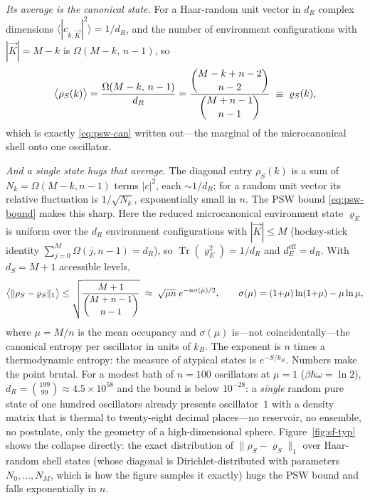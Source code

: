 \documentclass[11pt,a4paper]{article}
\theoremstyle{definition}
\begin{document}
\emph{Its average is the canonical state.} For a Haar-random unit vector in
$d_R$ complex dimensions $\langle|c_{k,\vec K}|^{2}\rangle=1/d_R$, and the number
of environment configurations with $|\vec K|=M-k$ is $\Omega(M-k,\,n-1)$, so
\begin{equation}\label{eq:sho-avg}
\big\langle\rho_S(k)\big\rangle
 =\frac{\Omega(M-k,\,n-1)}{d_R}
 =\frac{\dbinom{M-k+n-2}{\,n-2\,}}{\dbinom{M+n-1}{\,n-1\,}}
 \;\equiv\;\varrho_S(k),
\end{equation}
which is exactly \eqref{eq:psw-can} written out---the marginal of the
microcanonical shell onto one oscillator.

\emph{And a single state hugs that average.} The diagonal entry $\rho_S(k)$ is a
sum of $N_k=\Omega(M-k,n-1)$ terms $|c|^{2}$, each $\sim1/d_R$; for a random unit
vector its relative fluctuation is $1/\sqrt{N_k}$, exponentially small in $n$.
The PSW bound \eqref{eq:psw-bound} makes this sharp. Here the reduced
microcanonical environment state $\varrho_E$ is uniform over the $d_R$
environment configurations with $|\vec K|\le M$ (hockey-stick identity
$\sum_{j=0}^{M}\Omega(j,n-1)=d_R$), so $\operatorname{Tr}(\varrho_E^{2})=1/d_R$
and $d_E^{\mathrm{eff}}=d_R$. With $d_S=M+1$ accessible levels,
\begin{equation}\label{eq:sho-bound}
\big\langle\lVert\rho_S-\varrho_S\rVert_1\big\rangle
 \le\sqrt{\frac{M+1}{\dbinom{M+n-1}{\,n-1\,}}}
 \;\approx\;\sqrt{\mu n}\;e^{-n\sigma(\mu)/2},
\qquad
\sigma(\mu)=(1{+}\mu)\ln(1{+}\mu)-\mu\ln\mu,
\end{equation}
where $\mu=M/n$ is the mean occupancy and $\sigma(\mu)$ is---not
coincidentally---the canonical entropy per oscillator in units of $k_B$. The
exponent is $n$ times a thermodynamic entropy: the measure of atypical states is
$e^{-S/k_B}$. Numbers make the point brutal. For a modest bath of $n=100$
oscillators at $\mu=1$ ($\beta\hbar\omega=\ln2$),
$d_R=\binom{199}{99}\approx4.5\times10^{58}$ and the bound is below $10^{-28}$: a
\emph{single} random pure state of one hundred oscillators already presents
oscillator~$1$ with a density matrix that is thermal to twenty-eight decimal
places---no reservoir, no ensemble, no postulate, only the geometry of a
high-dimensional sphere.
Figure~\ref{fig:sf-typ} shows the collapse directly: the exact distribution of
$\lVert\rho_S-\varrho_S\rVert_1$ over Haar-random shell states (whose diagonal
is Dirichlet-distributed with parameters $N_0,\dots,N_M$, which is how the
figure samples it exactly) hugs the PSW bound and falls exponentially in $n$.
\end{document}
